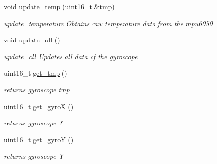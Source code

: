 \begin{DoxyCompactItemize}
\mbox{\label{classgyro__mpu6050_a5b41f980fa2a0a944e8cf9794f7d4c70}} 
void \hyperlink{classgyro__mpu6050_a5b41f980fa2a0a944e8cf9794f7d4c70}{update\+\_\+temp} (uint16\+\_\+t \&tmp)
\begin{DoxyCompactList}\small\item\em update\+\_\+temperature Obtains raw temperature data from the mpu6050 \end{DoxyCompactList}\item 
\mbox{\label{classgyro__mpu6050_a1462eef299ea464162b2113d9a14928d}} 
void \hyperlink{classgyro__mpu6050_a1462eef299ea464162b2113d9a14928d}{update\+\_\+all} ()
\begin{DoxyCompactList}\small\item\em update\+\_\+all Updates all data of the gyroscope \end{DoxyCompactList}\item 
\mbox{\label{classgyro__mpu6050_a99f8993b2e3af57de308a7162317bb59}} 
uint16\+\_\+t \hyperlink{classgyro__mpu6050_a99f8993b2e3af57de308a7162317bb59}{get\+\_\+tmp} ()
\begin{DoxyCompactList}\small\item\em returns gyroscope tmp \end{DoxyCompactList}\item 
\mbox{\label{classgyro__mpu6050_acc6e1e14ee53040db09c37bf439f7506}} 
uint16\+\_\+t \hyperlink{classgyro__mpu6050_acc6e1e14ee53040db09c37bf439f7506}{get\+\_\+gyroX} ()
\begin{DoxyCompactList}\small\item\em returns gyroscope X \end{DoxyCompactList}\item 
\mbox{\label{classgyro__mpu6050_a56f90145147ca6f7afeef6870a4abaf1}} 
uint16\+\_\+t \hyperlink{classgyro__mpu6050_a56f90145147ca6f7afeef6870a4abaf1}{get\+\_\+gyroY} ()
\begin{DoxyCompactList}\small\item\em returns gyroscope Y \end{DoxyCompactList}\item 
\mbox{\label{classgyro__mpu6050_a955e5fc73fb60db70d9fd21d9845041c}} 

\end{DoxyCompactItemize}
